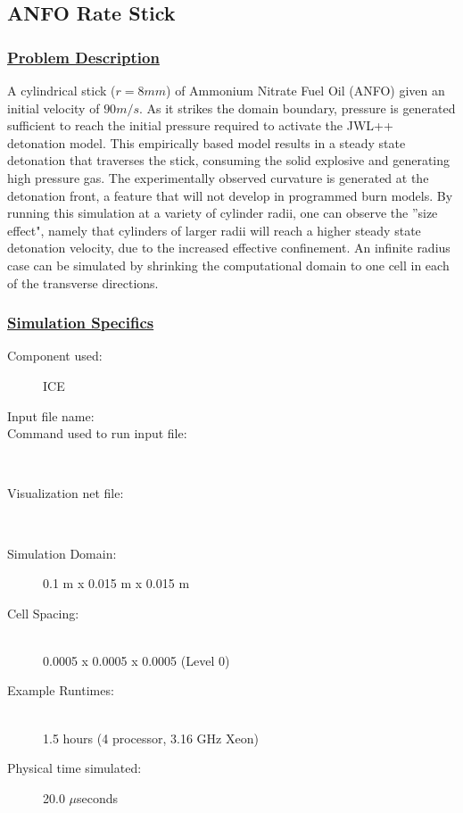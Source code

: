 \subsection*{\center ANFO Rate Stick}
%
%
\subsubsection*{\underline{Problem Description}}
%
A cylindrical stick ($r = 8 mm$) of Ammonium Nitrate Fuel Oil (ANFO) given an initial velocity of $90 m/s$.  As it strikes the domain boundary, pressure is generated sufficient to reach the initial pressure required to activate the JWL++~\cite{ref:JWL} detonation model.  This empirically based model results in a steady state detonation that traverses the stick, consuming the solid explosive and generating high pressure gas.  The experimentally observed curvature is generated at the detonation front, a feature that will not develop in programmed burn models.  By running this simulation at a variety of cylinder radii, one can observe the ''size effect", namely that cylinders of larger radii will reach a higher steady state detonation velocity, due to the increased effective confinement.  An infinite radius case can be simulated by shrinking the computational domain to one cell in each of the transverse directions.
%
\subsubsection*{\underline{Simulation Specifics}}
\begin{description}
\item [Component used:] \hfill ICE
\item [Input file name:] \hfill {}
\item [Command used to run input file:]\hfill \\
\item [Visualization net file:]\hfill {}\\

\item [Simulation Domain:]\hfill    0.1 m x 0.015 m x 0.015 m
\item [Cell Spacing:]\hfill \\
0.0005  x 0.0005  x 0.0005 (Level 0)\\

\item [Example Runtimes:] \hfill \\
 1.5 hours   (4 processor, 3.16 GHz Xeon)

\item [Physical time simulated:] \hfill 20.0 $\mu$seconds

\end{description}

